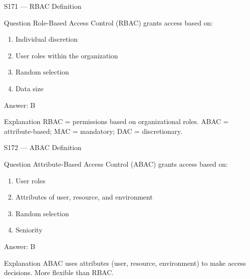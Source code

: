 \documentclass[aspectratio=169,8pt]{beamer}
\begin{document}
	\begin{frame}{S171 --- RBAC Definition}
		\begin{block}{Question}
			Role-Based Access Control (RBAC) grants access based on:
			\begin{enumerate}
				\item Individual discretion
				\item User roles within the organization
				\item Random selection
				\item Data size
			\end{enumerate}
		\end{block}
		\begin{exampleblock}{Answer: B}\end{exampleblock}
		\begin{block}{Explanation}
			RBAC = permissions based on organizational roles. ABAC = attribute-based; MAC = mandatory; DAC = discretionary.
		\end{block}
	\end{frame}
	
	\begin{frame}{S172 --- ABAC Definition}
		\begin{block}{Question}
			Attribute-Based Access Control (ABAC) grants access based on:
			\begin{enumerate}
				\item User roles
				\item Attributes of user, resource, and environment
				\item Random selection
				\item Seniority
			\end{enumerate}
		\end{block}
		\begin{exampleblock}{Answer: B}\end{exampleblock}
		\begin{block}{Explanation}
			ABAC uses attributes (user, resource, environment) to make access decisions. More flexible than RBAC.
		\end{block}
	\end{frame}
	
\end{document}
